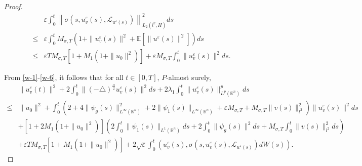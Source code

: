 \documentclass[11pt]{article}
\numberwithin{equation}{section}
\theoremstyle{plain}
\def\leq{\leqslant}
\begin{document}
\begin{proof}
    \begin{align}\label{w-6}
        & \varepsilon \int_{0}^{t}
        \left\| \sigma(s, u_v^\varepsilon (s), \mathcal{L}_{u^\varepsilon(s)} )
        \right\|^2_{L_2(l^2, H)} ds
        \nonumber \\
        \leq
        & \varepsilon \int_0^t
        M_{\sigma,T} \left( 1 + \| u_v^\varepsilon(s) \|^2 + \mathbb{E}\left[ \| u^\varepsilon(s) \|^2\right] \right) ds
        \nonumber \\
        \leq & \varepsilon T M_{\sigma,T} \left[ 1 + M_1( 1 + \|u_0\|^2 ) \right]
        + \varepsilon M_{\sigma,T} \int_0^t \| u_v^\varepsilon(s) \|^2 ds.
    \end{align}

    From \eqref{w-1}-\eqref{w-6},
    it follows that for all
    $t \in [0,T]$, $P$-almost surely,
    \begin{align}\label{w-7}
        & \|u_v^\varepsilon(t)\|^2
        + 2 \int_0^t \|(-\triangle)^{\frac{\alpha}{2}} u_v^\varepsilon (s) \|^2 ds
        + 2 \lambda_1 \int_{0}^{t} \| u_v^\varepsilon(s) \|_{L^p(\mathbb{R}^n)}^{p} ds
        \nonumber \\
        \leq
        & \| u_0 \|^2
        + \int_{0}^{t}
        \left( 2 + 4 \| \psi_g (s) \|_{L^\infty(\mathbb{R}^n)}^2
        + 2 \| \psi_1 (s)\|_{L^\infty(\mathbb{R}^n)}
        + \varepsilon M_{\sigma,T}
        + M_{\sigma,T} \| v(s) \|_{l^2}^2
        \right) \| u_v^\varepsilon(s) \|^2 ds
        \nonumber \\
        & + \left[ 1 + 2 M_1( 1 + \|u_0\|^2 ) \right]
        \left( 2 \int_{0}^{t} \| \psi_1(s) \|_{L^1(\mathbb{R}^n)} ds
        + 2 \int_{0}^{t} \| \psi_g (s) \|^2 ds
        + M_{\sigma,T} \int_{0}^{t} \| v(s) \|_{l^2}^2 ds
        \right)
        \nonumber \\
        & + \varepsilon T M_{\sigma,T} \left[ 1 + M_1( 1 + \|u_0\|^2 ) \right]
        + 2 \sqrt{\varepsilon} \int_{0}^{t}
        \left( u_v^\varepsilon (s), \sigma(s, u_v^\varepsilon (s), \mathcal{L}_{u^\varepsilon(s)} ) dW(s) \right).
    \end{align}


\end{proof}
\end{document}
